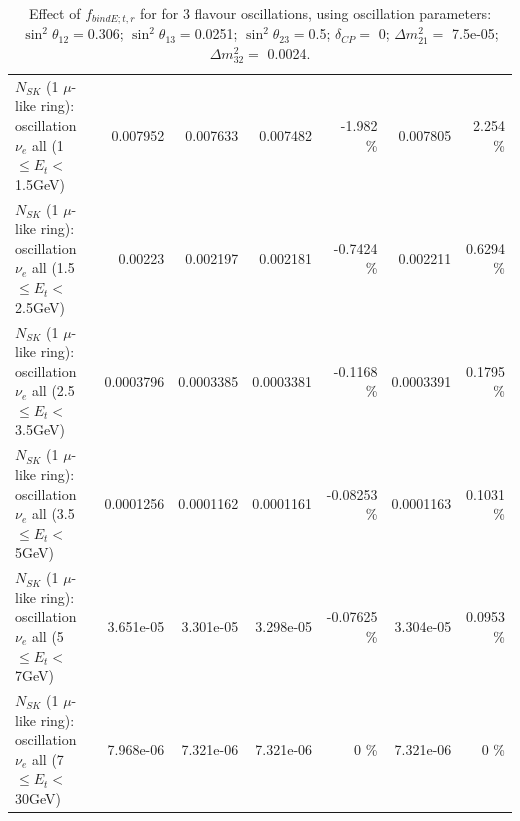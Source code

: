 \begin{table}
\begin{tabular}{| l | r | r | r  r | r  r |}
$N_{SK}$ (1 $\mu$-like ring): oscillation $\nu_{e}$ all (1 $\leq E_{t} <$ 1.5GeV) &        0.007952 &        0.007633 &        0.007482 &   -1.982 \%  &        0.007805 &    2.254 \%  \\ 
$N_{SK}$ (1 $\mu$-like ring): oscillation $\nu_{e}$ all (1.5 $\leq E_{t} <$ 2.5GeV) &         0.00223 &        0.002197 &        0.002181 &  -0.7424 \%  &        0.002211 &   0.6294 \%  \\ 
$N_{SK}$ (1 $\mu$-like ring): oscillation $\nu_{e}$ all (2.5 $\leq E_{t} <$ 3.5GeV) &       0.0003796 &       0.0003385 &       0.0003381 &  -0.1168 \%  &       0.0003391 &   0.1795 \%  \\ 
$N_{SK}$ (1 $\mu$-like ring): oscillation $\nu_{e}$ all (3.5 $\leq E_{t} <$ 5GeV) &       0.0001256 &       0.0001162 &       0.0001161 & -0.08253 \%  &       0.0001163 &   0.1031 \%  \\ 
 $N_{SK}$ (1 $\mu$-like ring): oscillation $\nu_{e}$ all (5 $\leq E_{t} <$ 7GeV) &       3.651e-05 &       3.301e-05 &       3.298e-05 & -0.07625 \%  &       3.304e-05 &   0.0953 \%  \\ 
$N_{SK}$ (1 $\mu$-like ring): oscillation $\nu_{e}$ all (7 $\leq E_{t} <$ 30GeV) &       7.968e-06 &       7.321e-06 &       7.321e-06 &        0 \%  &       7.321e-06 &        0 \%  \\ 
\hline
\hline
\end{tabular}
\caption{ Effect of $f_{bindE; t, r}$ for for 3 flavour oscillations, using oscillation parameters:  $\sin^2\theta_{12} = $0.306; $\sin^2\theta_{13} = $0.0251; $\sin^2\theta_{23} = $0.5; $\delta_{CP} = $        0; $\Delta m^2_{21} = $    7.5e-05; $\Delta m^2_{32} = $    0.0024. }
\label{tab:num_xsec_bindE_1RmuT_3f_osc_t13:0.0251}
\end{table}
\clearpage
